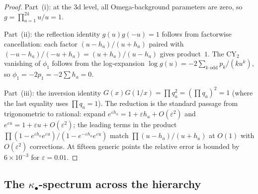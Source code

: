 \begin{proof}
Part~(i): at the 3d level, all Omega-background parameters are zero, so $g = \prod_{a=1}^{24} u/u = 1$.

Part~(ii): the reflection identity $g(u) g(-u) = 1$ follows from factorwise cancellation: each factor $(u - h_a)/(u + h_a)$ paired with $(-u - h_a)/(-u + h_a) = (u + h_a)/(u - h_a)$ gives product~$1$. The CY$_2$ vanishing of $\phi_1$ follows from the log-expansion $\log g(u) = -2 \sum_{k \text{ odd}} p_k / (k u^k)$, so $\phi_1 = -2 p_1 = -2 \sum h_a = 0$.

Part~(iii): the inversion identity $G(x) G(1/x) = \prod q_a^2 = (\prod q_a)^2 = 1$ (where the last equality uses $\prod q_a = 1$). The reduction is the standard passage from trigonometric to rational: expand $e^{\varepsilon h_a} = 1 + \varepsilon h_a + O(\varepsilon^2)$ and $e^{\varepsilon u} = 1 + \varepsilon u + O(\varepsilon^2)$; the leading terms in the product $\prod (1 - e^{\varepsilon h_a} e^{\varepsilon u})/(1 - e^{-\varepsilon h_a} e^{\varepsilon u})$ match $\prod (u - h_a)/(u + h_a)$ at $O(1)$ with \(O(\varepsilon^2)\) corrections. At fifteen generic points the relative error is bounded by \(6 \times 10^{-3}\) for \(\varepsilon = 0.01\).
\end{proof}

\subsection{The \texorpdfstring{$\kappa_\bullet$}{kappa-.}-spectrum across the hierarchy}
\label{subsec:k3-kappa-hierarchy}


